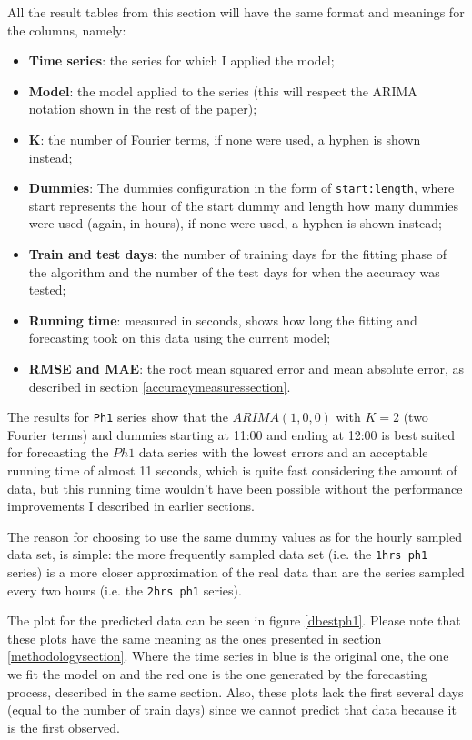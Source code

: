 \documentclass[12pt,a4paper,titlepage]{report}
\begin{document}
All the result tables from this section will have the same format and meanings for the columns, namely:
\begin{itemize}
    \item \textbf{Time series}: the series for which I applied the model;
    \item \textbf{Model}: the model applied to the series (this will respect the ARIMA notation shown in the rest of the paper);
    \item \textbf{K}: the number of Fourier terms, if none were used, a hyphen is shown instead;
    \item \textbf{Dummies}: The dummies configuration in the form of \texttt{start:length}, where start represents the hour of the start dummy and length how many dummies were used (again, in hours), if none were used, a hyphen is shown instead;
    \item \textbf{Train and test days}: the number of training days for the fitting phase of the algorithm and the number of the test days for when the accuracy was tested;
    \item \textbf{Running time}: measured in seconds, shows how long the fitting and forecasting took on this data using the current model;
    \item \textbf{RMSE and MAE}: the root mean squared error and mean absolute error, as described in section \ref{accuracymeasuressection}.
\end{itemize}

The results for \texttt{Ph1} series show that the $ ARIMA(1, 0, 0) $ with $ K=2 $ (two Fourier terms) and dummies starting at 11:00 and ending at 12:00 is best suited for forecasting the $ Ph1 $ data series with the lowest errors and an acceptable running time of almost 11 seconds, which is quite fast considering the amount of data, but this running time wouldn't have been possible without the performance improvements I described in earlier sections.

The reason for choosing to use the same dummy values as for the hourly sampled data set, is simple: the more frequently sampled data set (i.e. the \texttt{1hrs ph1} series) is a more closer approximation of the real data than are the series sampled every two hours (i.e. the \texttt{2hrs ph1} series).

The plot for the predicted data can be seen in figure \ref{dbestph1}. Please note that these plots have the same meaning as the ones presented in section \ref{methodologysection}. Where the time series in blue is the original one, the one we fit the model on and the red one is the one generated by the forecasting process, described in the same section. Also, these plots lack the first several days (equal to the number of train days) since we cannot predict that data because it is the first observed.
    
\end{document}
